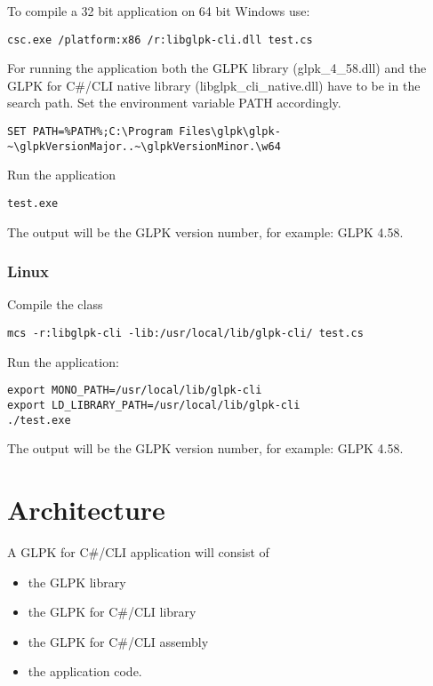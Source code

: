 \documentclass[a4paper,11pt]{report}
\newcommand{\glpkVersionMajor}{4}
\newcommand{\glpkVersionMinor}{58}
\begin{document}
To compile a 32 bit application on 64 bit Windows use:

\begin{lstlisting}
csc.exe /platform:x86 /r:libglpk-cli.dll test.cs
\end{lstlisting}

For running the application both the GLPK library
(glpk\_\glpkVersionMajor\_\glpkVersionMinor.dll) and the GLPK for C\#/CLI
native library (libglpk\_cli\_native.dll) have to be in the search path.
Set the environment variable PATH accordingly.

\begin{lstlisting}
SET PATH=%PATH%;C:\Program Files\glpk\glpk-~\glpkVersionMajor..~\glpkVersionMinor.\w64
\end{lstlisting}

Run the application

\begin{lstlisting}
test.exe
\end{lstlisting}

The output will be the GLPK version number, for example:
GLPK \glpkVersionMajor.\glpkVersionMinor.

\subsection{Linux}
Compile the class

\begin{lstlisting}
mcs -r:libglpk-cli -lib:/usr/local/lib/glpk-cli/ test.cs
\end{lstlisting}

Run the application:

\begin{lstlisting}
export MONO_PATH=/usr/local/lib/glpk-cli
export LD_LIBRARY_PATH=/usr/local/lib/glpk-cli
./test.exe
\end{lstlisting}

The output will be the GLPK version number, for example:
GLPK \glpkVersionMajor.\glpkVersionMinor.

\chapter{Architecture}
A GLPK for C\#/CLI application will consist of
\begin{itemize}
\item the GLPK library
\item the GLPK for C\#/CLI library
\item the GLPK for C\#/CLI assembly
\item the application code.
\end{itemize}
\end{document}
